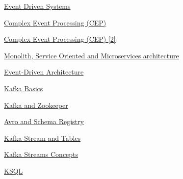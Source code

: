 \documentclass[10pt,a4paper]{article}
\begin{document}
\begin{thebibliography}{1}
\newblock \href{https://medium.com/omarelgabrys-blog/event-driven-systems-cdbe5a4b3d04}{Event Driven Systems}

\newblock \href{https://databricks.com/glossary/complex-event-processing}{Complex Event Processing (CEP)}

\newblock \href{https://datainsights.de/complex-event-processing}{Complex Event Processing (CEP) [2]}

\newblock \href{https://rubygarage.org/blog/monolith-soa-microservices-serverless}{Monolith, Service Oriented and Microservices architecture}

\newblock \href{https://aws.amazon.com/it/event-driven-architecture/}{Event-Driven Architecture}

\newblock \href{https://kafka.apache.org/intro}{Kafka Basics}

\newblock \href{https://www.cloudkarafka.com/blog/2018-07-04-cloudkarafka_what_is_zookeeper.html}{Kafka and Zookeeper}

\newblock \href{https://aseigneurin.github.io/2018/08/02/kafka-tutorial-4-avro-and-schema-registry.html}{Avro and Schema Registry}

\newblock \href{https://www.confluent.io/blog/kafka-streams-tables-part-1-event-streaming/}{Kafka Stream and Tables}

\newblock \href{https://docs.confluent.io/current/streams/concepts.html}{Kafka Streams Concepts}

\newblock \href{https://www.confluent.io/blog/ksql-streaming-sql-for-apache-kafka/}{KSQL}

\end{thebibliography}
\end{document}
